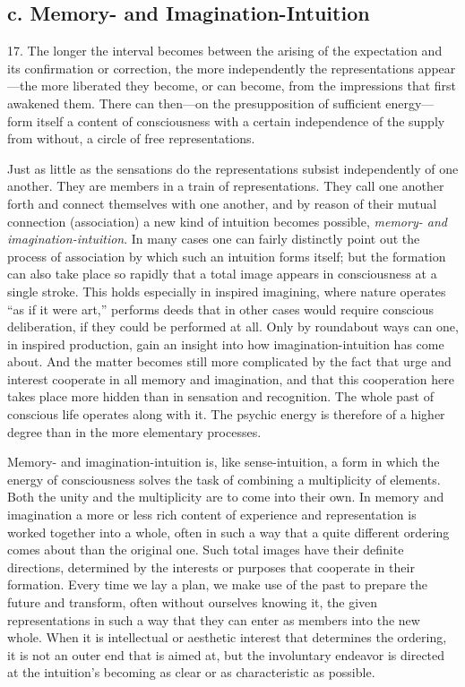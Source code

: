 \documentclass[12pt,a4paper]{book}
\newcommand{\opage}[1]{\marginnote{\footnotesize\textit{[#1]}}}
\begin{document}
\subsection*{c. Memory- and Imagination-Intuition}
\label{ssec:erindring}

17. The longer the interval becomes between the arising of the
\opage{52}expectation and its confirmation or correction, the more independently
the representations appear---the more liberated they become, or can
become, from the impressions that first awakened them. There can
then---on the presupposition of sufficient energy---form itself a content
of consciousness with a certain independence of the supply from without, a
circle of free representations.

Just as little as the sensations do the representations subsist
independently of one another. They are members in a train of
representations. They call one another forth and connect themselves with
one another, and by reason of their mutual connection (association) a new
kind of intuition becomes possible, \emph{memory- and imagination-intuition}.
In many cases one can fairly distinctly point out the process of
association by which such an intuition forms itself; but the formation can
also take place so rapidly that a total image appears in consciousness at
a single stroke. This holds especially in inspired imagining, where nature
operates ``as if it were art,'' performs deeds that in other cases would
require conscious deliberation, if they could be performed at all. Only by
roundabout ways can one, in inspired production, gain an insight into how
imagination-intuition has come about. And the matter becomes still more
complicated by the fact that urge and interest cooperate in all memory and
imagination, and that this cooperation here takes place more hidden than in
sensation and recognition. The whole past of conscious life operates along
with it. The psychic energy is therefore of a higher degree than in the
more elementary processes.

Memory- and imagination-intuition is, like sense-intuition, a form in
which the energy of consciousness solves the task of combining a
multiplicity of elements. Both the unity and the multiplicity are to come
into their own. \opage{53}In memory and imagination a more or less rich content of
experience and representation is worked together into a whole, often in
such a way that a quite different ordering comes about than the original
one. Such total images have their definite directions, determined by the
interests or purposes that cooperate in their formation. Every time we lay
a plan, we make use of the past to prepare the future and transform,
often without ourselves knowing it, the given representations in such a
way that they can enter as members into the new whole. When it is
intellectual or aesthetic interest that determines the ordering, it is not
an outer end that is aimed at, but the involuntary endeavor is directed at
the intuition's becoming as clear or as characteristic as possible.
\end{document}
